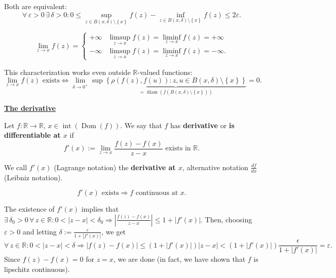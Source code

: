 \documentclass{notes}
\begin{document}
  \begin{prf}
    Both are equivalent: 
    \[
      \forall \, \varepsilon > 0 \, \exists \, \delta > 0: 0 \leq \sup_{z \in B(x, \delta) \setminus \left \{ x \right \}} f(z) - \inf_{z \in B(x, \delta) \setminus \left \{ x \right \}} f(z) \leq 2 \varepsilon.
    \]
  \end{prf}
  
  \begin{defn}
    \[
      \lim_{z \to x} f(z) = \begin{cases}
        +\infty & \limsup_{z \to x} f(z) = \liminf_{z \to x} f(z) = +\infty \\
        -\infty & \limsup_{z \to x} f(z) = \liminf_{z \to x} f(z) = -\infty.
      \end{cases}
    \]
  \end{defn}
  
  \begin{note}
    This characterization works even outside $\mathbb R$-valued functions:
    \[
      \lim_{z \to x} f(z) \text{ exists} \Leftrightarrow \lim_{\delta \to 0^+} \sup \underbrace{\left \{ \rho(f(z), f(u)) : z, u \in B(x, \delta) \setminus \left \{ x \right \} \right \}}_{= \operatorname{diam}(f(B(x, \delta) \setminus \left \{ x \right \}))} = 0.
    \]
  \end{note}
  
  \newpage
  
  \underline{\boldmath \bfseries The derivative}

  \begin{defn}
    Let $f \colon \mathbb R \to \mathbb R$, $x \in \operatorname{int} (\operatorname{Dom}(f))$.
    We say that $f$ has {\boldmath \bfseries derivative} or {\boldmath \bfseries is differentiable at $x$} if 
    \[
      f'(x) := \lim_{z \to x} \frac{f(z) - f(x)}{z - x} \text{ exists in $\mathbb R$}.
    \]
    
    We call $f'(x)$ (Lagrange notation) the {\boldmath \bfseries derivative at $x$}, alternative notation $\frac{df}{dx}$ (Leibniz notation).
  \end{defn}
  
  \begin{lem}
    \[
      f'(x) \text{ exists} \Rightarrow \text{$f$ continuous at $x$}.
    \]
  \end{lem}
  
  \begin{prf}
    The existence of $f'(x)$ implies that $\exists \, \delta_0 > 0 \, \forall \, z \in \mathbb R: 0 < \left | z - x \right | < \delta_0 \Rightarrow \left | \frac{f(z) - f(x)}{z - x} \right | \leq 1 + \left | f'(x) \right |$.
    Then, choosing $\varepsilon > 0$ and letting $\delta := \frac{\varepsilon}{1 + \left | f'(x) \right |}$, we get 
    \[
      \forall \, z \in \mathbb R: 0 < \left | z - x \right | < \delta \mathbb \Rightarrow \left | f(z) - f(x) \right | \leq (1 + \left | f'(x) \right |) \left | z - x \right | < (1 + \left | f'(x) \right |) \frac{\epsilon}{1 + \left | f'(x) \right |} = \varepsilon.
    \]
    Since $f(z) - f(x) = 0$ for $z = x$, we are done (in fact, we have shown that $f$ is lipschitz continuous).
  \end{prf}
  
\end{document}
